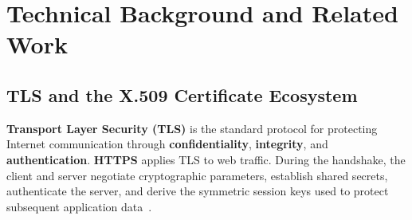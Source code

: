 
\chapter{Technical Background and Related Work}
\label{chap:background-related-work}

\section{TLS and the X.509 Certificate Ecosystem}
\label{sec:tls-x509-ecosystem}

\textbf{Transport Layer Security (TLS)} is the standard protocol for protecting
Internet communication through \textbf{confidentiality}, \textbf{integrity},
and \textbf{authentication}. \textbf{HTTPS} applies TLS to web traffic. During
the handshake, the client and server negotiate cryptographic parameters,
establish shared secrets, authenticate the server, and derive the symmetric session keys used
to protect subsequent application data~\cite{rfc8446}.

